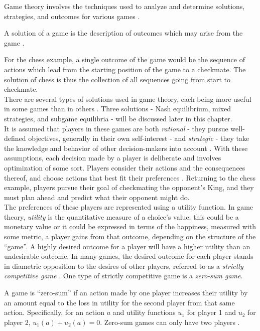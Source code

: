 Game theory involves the techniques used to analyze and determine solutions, strategies, and outcomes for various games \cite{osbo94}.
\begin{define}
  A solution of a game is the description of outcomes which may arise from the game \cite{osbo94}.
\end{define}

For the chess example, a single outcome of the game would be the sequence of actions which lead from the starting position of the game to a checkmate. The solution of chess is thus the collection of all sequences going from start to checkmate.\\

There are several types of solutions used in game theory, each being more useful in some games than in others \cite{osbo94}. Three solutions - Nash equilibrium, mixed strategies, and subgame equilibria - will be discussed later in this chapter.\\

It is assumed that players in these games are both \textit{rational} - they pursue well-defined objectives, generally in their own self-interest - and \textit{strategic} - they take the knowledge and behavior of other decision-makers into account \cite{osbo94}. With these assumptions, each decision made by a player is deliberate and involves optimization of some sort. Players consider their actions and the consequences thereof, and choose actions that best fit their preferences \cite{osbo94}. Returning to the chess example, players pursue their goal of checkmating the opponent's King, and they must plan ahead and predict what their opponent might do.\\

The preferences of these players are represented using a utility function. In game theory, \textit{utility} is the quantitative measure of a choice's value; this could be a monetary value or it could be expressed in terms of the happiness, measured with some metric, a player gains from that outcome, depending on the structure of the ``game''. A highly desired outcome for a player will have a higher utility than an undesirable outcome. In many games, the desired outcome for each player stands in diametric opposition to the desires of other players, referred to as a \textit{strictly competitive game} \cite{osbo94}. One type of strictly competitive game is a \textit{zero-sum game}.
\begin{define}
  A game is ``zero-sum'' if an action made by one player increases their utility by an amount equal to the loss in utility for the second player from that same action. Specifically, for an action $a$ and utility functions $u_1$ for player 1 and $u_2$ for player 2, $u_1(a)+u_2(a)=0$. Zero-sum games can only have two players \cite{shoh09}.
\end{define}

